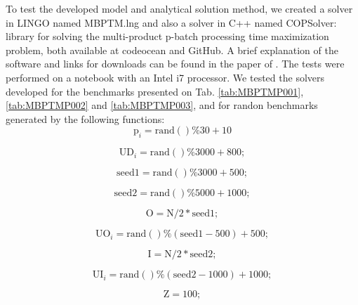 \documentclass[10pt,fleqn,a4paper,twoside]{article}
\begin{document}
To test the developed model and analytical solution method, we created a solver in LINGO named MBPTM.lng and also a solver in C++ named COPSolver: library for solving the multi-product p-batch processing time maximization problem, both available at codeocean and GitHub. A brief explanation of the software and links for downloads can be found in the paper of \cite{Fraga2023}. The tests were performed on a notebook with an Intel i7 processor. We tested the solvers developed for the benchmarks presented on Tab. \ref{tab:MBPTMP001}, \ref{tab:MBPTMP002} and \ref{tab:MBPTMP003}, and for randon benchmarks generated by the following functions: \\

\begin{equation}
\textrm{p}_i = \textrm{rand}()\%30 + 10
\end{equation}

\begin{equation}
\textrm{UD}_i = \textrm{rand}()\%3000 + 800;
\end{equation}

\begin{equation}
 \textrm{seed1} = \textrm{rand}()\%3000 + 500;
\end{equation}

\begin{equation}
\textrm{seed2} = \textrm{rand}()\%5000 + 1000;
\end{equation}

\begin{equation}
\textrm{O} = \textrm{N}/2*\textrm{seed1};
\end{equation}

\begin{equation}
\textrm{UO}_i = \textrm{rand}()\%(\textrm{seed1}-500) + 500;
\end{equation}

\begin{equation}
\textrm{I} = \textrm{N}/2*\textrm{seed2};
\end{equation}

\begin{equation}
\textrm{UI}_i = \textrm{rand}()\%(\textrm{seed2}-1000) + 1000;
\end{equation}

\begin{equation}
\textrm{Z} = 100;
\end{equation}
\end{document}
